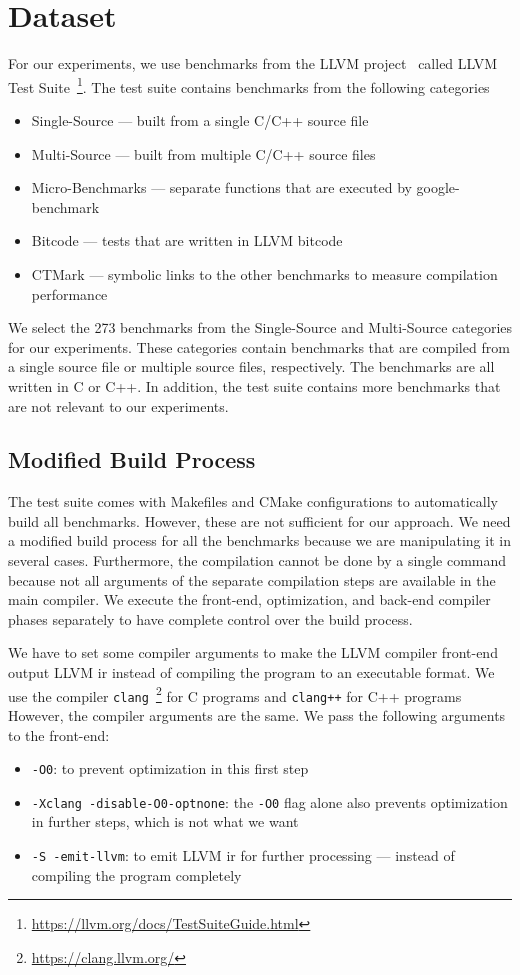 \section{Dataset}
\label{sec:approach:dataset}
For our experiments, we use benchmarks from the LLVM project~\cite{LLVM:CGO04} called LLVM Test Suite~\footnote{\url{https://llvm.org/docs/TestSuiteGuide.html}}.
The test suite contains benchmarks from the following categories
\begin{itemize}
    \item Single-Source --- built from a single C/C++ source file
    \item Multi-Source --- built from multiple C/C++ source files
    \item Micro-Benchmarks --- separate functions that are executed by google-benchmark
    \item Bitcode --- tests that are written in LLVM bitcode
    \item CTMark --- symbolic links to the other benchmarks to measure compilation performance
\end{itemize}
We select the 273 benchmarks from the Single-Source and Multi-Source categories for our experiments.
These categories contain benchmarks that are compiled from a single source file or multiple source files, respectively.
The benchmarks are all written in C or C++.
In addition, the test suite contains more benchmarks that are not relevant to our experiments. 

\subsection{Modified Build Process}
\label{sec:approach:build_process}
The test suite comes with Makefiles and CMake configurations to automatically build all benchmarks.
However, these are not sufficient for our approach.
We need a modified build process for all the benchmarks because we are manipulating it in several cases.
Furthermore, the compilation cannot be done by a single command because not all arguments of the separate compilation steps are available in the main compiler.
We execute the front-end, optimization, and back-end compiler phases separately to have complete control over the build process.

We have to set some compiler arguments to make the LLVM compiler front-end output LLVM \ac{ir} instead of compiling the program to an executable format.
We use the compiler \lstinline{clang}~\footnote{\url{https://clang.llvm.org/}} for C programs and \lstinline{clang++} for C++ programs
However, the compiler arguments are the same.
We pass the following arguments to the front-end:
\begin{itemize}
    \item \lstinline{-O0}: to prevent optimization in this first step
    \item \lstinline{-Xclang -disable-O0-optnone}: the \lstinline{-O0} flag alone also prevents optimization in further steps, which is not what we want
    \item \lstinline{-S -emit-llvm}: to emit LLVM \ac{ir} for further processing --- instead of compiling the program completely
\end{itemize}

